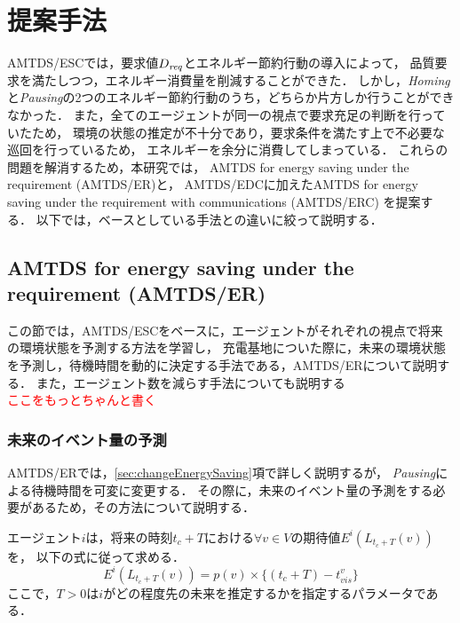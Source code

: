 \documentclass[12pt,a4j,twoside]{jarticle}
\def\Dreq{{D_{\it req}}}
\def\red#1{\textcolor{red}{#1}}
\begin{document}
  \section{提案手法}
  AMTDS/ESCでは，要求値$\Dreq$とエネルギー節約行動の導入によって，
  品質要求を満たしつつ，エネルギー消費量を削減することができた．
  しかし，{\em Homing}と{\em Pausing}の2つのエネルギー節約行動のうち，どちらか片方しか行うことができなかった．
  また，全てのエージェントが同一の視点で要求充足の判断を行っていたため，
  環境の状態の推定が不十分であり，要求条件を満たす上で不必要な巡回を行っているため，
  エネルギーを余分に消費してしまっている．
  これらの問題を解消するため，本研究では，
  AMTDS for energy saving under the requirement (AMTDS/ER)と，
  AMTDS/EDCに加えたAMTDS for energy saving under the requirement with communications (AMTDS/ERC)
  を提案する．
  以下では，ベースとしている手法との違いに絞って説明する．
  
  \subsection{AMTDS for energy saving under the requirement (AMTDS/ER)}
  この節では，AMTDS/ESCをベースに，エージェントがそれぞれの視点で将来の環境状態を予測する方法を学習し，
  充電基地についた際に，未来の環境状態を予測し，待機時間を動的に決定する手法である，AMTDS/ERについて説明する．
  また，エージェント数を減らす手法についても説明する
  \\ \red{ここをもっとちゃんと書く}
  

  \subsubsection{未来のイベント量の予測}\label{sec:predict}
  AMTDS/ERでは，\ref{sec:changeEnergySaving}項で詳しく説明するが，
  {\em Pausing}による待機時間を可変に変更する．
  その際に，未来のイベント量の予測をする必要があるため，その方法について説明する．
  \par

  エージェント$i$は，将来の時刻$t_c+T$における$\forall v\in V$の期待値$E^i(L_{t_c+T}(v))$を，
  以下の式に従って求める．
  \begin{equation}\label{eq:estimation}
    E^i(L_{t_c+T}(v)) = p(v) \times \{(t_c+T)-t^v_{vis}\}
  \end{equation}
  ここで，$T>0$は$i$がどの程度先の未来を推定するかを指定するパラメータである．
  
\end{document}
